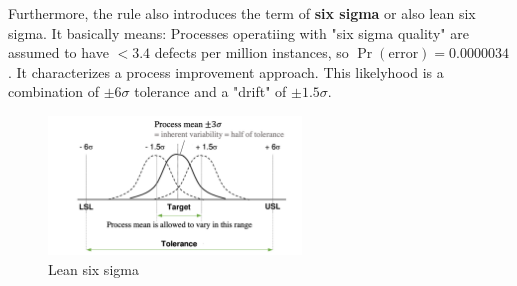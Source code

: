Furthermore, the rule also introduces the term of \textbf{six sigma} or also lean six sigma. It basically means: Processes operatiing with "six sigma quality" are assumed to have $< 3.4$ defects per million instances, so $\Pr(\text{error})=0.0000034$. It characterizes a process improvement approach. This likelyhood is a combination of $\pm6\sigma$ tolerance and a "drift" of $\pm1.5\sigma$. 

\begin{figure}[H]
  \centering
  \includegraphics[width=0.6\textwidth]{assets/visualization_and_extraction/lean_six_sigma.png}
  \caption{Lean six sigma}
  \label{fig:2_lean_six_sigma}
\end{figure}
